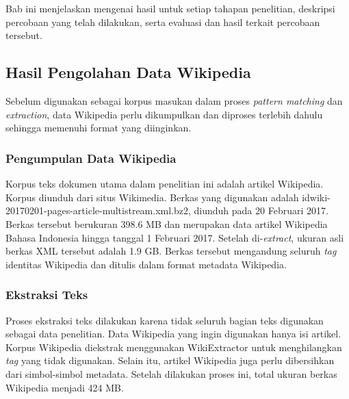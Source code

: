 \chapter{\babLima}
Bab ini menjelaskan mengenai hasil untuk setiap tahapan penelitian, deskripsi percobaan yang telah dilakukan, serta evaluasi dan hasil terkait percobaan tersebut.

\section{Hasil Pengolahan Data Wikipedia}
Sebelum digunakan sebagai korpus masukan dalam proses \textit{pattern matching} dan \textit{extraction}, data Wikipedia perlu dikumpulkan dan diproses terlebih dahulu sehingga memenuhi format yang diinginkan.

\subsection{Pengumpulan Data Wikipedia}
Korpus teks dokumen utama dalam penelitian ini adalah artikel Wikipedia. Korpus diunduh dari situs Wikimedia. Berkas yang digunakan adalah idwiki-20170201-pages-article-multistream.xml.bz2, diunduh pada 20 Februari 2017. Berkas tersebut berukuran 398.6 MB dan merupakan data artikel Wikipedia Bahasa Indonesia hingga tanggal 1 Februari 2017. Setelah di-\textit{extract}, ukuran asli berkas XML tersebut adalah 1.9 GB. Berkas tersebut mengandung seluruh \textit{tag} identitas Wikipedia dan ditulis dalam format metadata Wikipedia. 

\subsection{Ekstraksi Teks}
Proses ekstraksi teks dilakukan karena tidak seluruh bagian teks digunakan sebagai data penelitian. Data Wikipedia yang ingin digunakan hanya isi artikel. Korpus Wikipedia diekstrak menggunakan WikiExtractor untuk menghilangkan \textit{tag} yang tidak digunakan. Selain itu, artikel Wikipedia juga perlu dibersihkan dari simbol-simbol metadata. Setelah dilakukan proses ini, total ukuran berkas Wikipedia menjadi 424 MB.

